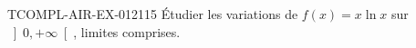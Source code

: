 \begin{exercice}{TCOMPL-AIR-EX-012}{1}{15}
Étudier les variations de $f(x) = x\ln x$ sur $\left]0, +\infty\right[$, limites comprises.

\end{exercice}
